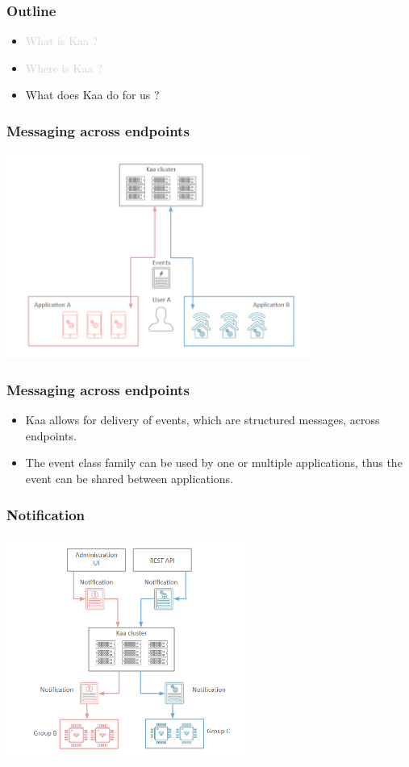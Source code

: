 \documentclass{beamer}
\begin{document}
\begin{frame}
	\frametitle{Outline}
	\begin{itemize}
		\item \textcolor{LightGray}{What is Kaa ?}
		\item \textcolor{LightGray}{Where is Kaa ?}
		\item What does Kaa do for us ?
	\end{itemize}
\end{frame}

\begin{frame}
	\frametitle{Messaging across endpoints}
	\centering\includegraphics[width=10cm]{figs/messaging.png}
\end{frame}

\begin{frame}
	\frametitle{Messaging across endpoints}
	\begin{itemize}
		\item Kaa allows for delivery of events, which are structured messages,
			\textcolor{TextOrange}{across endpoints}.
		\item The event class family can be used by one or multiple applications,
			thus the \textcolor{TextGreen}{event can be shared between applications}.
	\end{itemize}
\end{frame}

\begin{frame}
	\frametitle{Notification}
	\centering\includegraphics[width=8cm]{figs/notification.png}
\end{frame}
\end{document}
